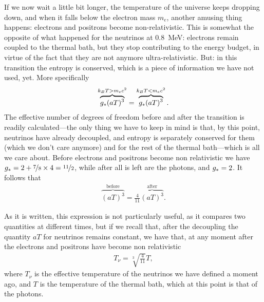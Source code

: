 If we now wait a little bit longer, the temperature of the universe keeps dropping
down, and when it falls below the electron mass $m_e$, another amusing thing happens:
electrons and positrons become non-relativistic.
This is somewhat the opposite of what happened for the neutrinos at 0.8~MeV:
electrons remain coupled to the thermal bath, but they stop contributing to the
energy budget, in virtue of the fact that they are not anymore ultra-relativistic.
But: in this transition the entropy is conserved, which is a piece of information
we have not used, yet. More specifically
\begin{align*}
  \overbrace{g_* (aT)^3}^{k_B T > m_e c^2} =
  \overbrace{g_* (aT)^3}^{k_B T < m_e c^2}.
\end{align*}
The effective number of degrees of freedom before and after the transition is readily
calculated---the only thing we have to keep in mind is that, by this point, neutrinos
have already decoupled, and entropy is separately conserved for them (which we
don't care anymore) and for the rest of the thermal bath---which is all we care
about. Before electrons and positrons become non relativistic we have
$g_* = 2 + \nicefrac{7}{8} \times 4 = \nicefrac{11}{2}$, while after all is left
are the photons, and $g_* = 2$. It follows that
\begin{align*}
  \overbrace{(aT)^3}^\text{before} = \frac{4}{11} \overbrace{(aT)^3}^\text{after}.
\end{align*}

As it is written, this expression is not particularly useful, as it compares two
quantities at different times, but if we recall that, after the decoupling the
quantity $aT$ for neutrinos remains constant, we have that, at any moment after
the electrons and positrons have become non relativistic
\begin{align}
  T_\nu = \sqrt[3]{\frac{4}{11}} T,
\end{align}
where $T_\nu$ is the effective temperature of the neutrinos we have defined a moment
ago, and $T$ is the temperature of the thermal bath, which at this point is that
of the photons.


